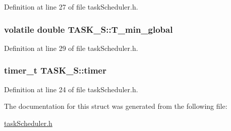 Definition at line 27 of file task\-Scheduler.\-h.

\hypertarget{structTASK__S_a07174e333a0013f4d51b30509b388f58}{
\subsubsection[{T\-\_\-min\-\_\-global}]{\setlength{\rightskip}{0pt plus 5cm}volatile double T\-A\-S\-K\-\_\-\-S\-::\-T\-\_\-min\-\_\-global}}\label{structTASK__S_a07174e333a0013f4d51b30509b388f58}


Definition at line 29 of file task\-Scheduler.\-h.

\hypertarget{structTASK__S_a17834f3d4f84241ccb4191f3cf7d7af3}{
\subsubsection[{timer}]{\setlength{\rightskip}{0pt plus 5cm}timer\-\_\-t T\-A\-S\-K\-\_\-\-S\-::timer}}\label{structTASK__S_a17834f3d4f84241ccb4191f3cf7d7af3}


Definition at line 24 of file task\-Scheduler.\-h.



The documentation for this struct was generated from the following file\-:\begin{DoxyCompactItemize}
\item 
\hyperlink{taskScheduler_8h}{task\-Scheduler.\-h}\end{DoxyCompactItemize}
